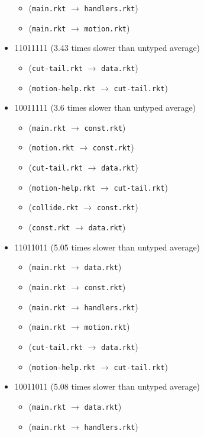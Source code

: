 \documentclass{article}
\newcommand{\mono}[1]{\texttt{#1}}
\begin{document}
\begin{itemize}
\begin{itemize}
  \item (\mono{main.rkt} $\rightarrow$ \mono{handlers.rkt})
  \item (\mono{main.rkt} $\rightarrow$ \mono{motion.rkt})
  \end{itemize}
\item 11011111 (3.43 times slower than untyped average)
  \begin{itemize}
  \item (\mono{cut-tail.rkt} $\rightarrow$ \mono{data.rkt})
  \item (\mono{motion-help.rkt} $\rightarrow$ \mono{cut-tail.rkt})
  \end{itemize}
\item 10011111 (3.6 times slower than untyped average)
  \begin{itemize}
  \item (\mono{main.rkt} $\rightarrow$ \mono{const.rkt})
  \item (\mono{motion.rkt} $\rightarrow$ \mono{const.rkt})
  \item (\mono{cut-tail.rkt} $\rightarrow$ \mono{data.rkt})
  \item (\mono{motion-help.rkt} $\rightarrow$ \mono{cut-tail.rkt})
  \item (\mono{collide.rkt} $\rightarrow$ \mono{const.rkt})
  \item (\mono{const.rkt} $\rightarrow$ \mono{data.rkt})
  \end{itemize}
\item 11011011 (5.05 times slower than untyped average)
  \begin{itemize}
  \item (\mono{main.rkt} $\rightarrow$ \mono{data.rkt})
  \item (\mono{main.rkt} $\rightarrow$ \mono{const.rkt})
  \item (\mono{main.rkt} $\rightarrow$ \mono{handlers.rkt})
  \item (\mono{main.rkt} $\rightarrow$ \mono{motion.rkt})
  \item (\mono{cut-tail.rkt} $\rightarrow$ \mono{data.rkt})
  \item (\mono{motion-help.rkt} $\rightarrow$ \mono{cut-tail.rkt})
  \end{itemize}
\item 10011011 (5.08 times slower than untyped average)
  \begin{itemize}
  \item (\mono{main.rkt} $\rightarrow$ \mono{data.rkt})
  \item (\mono{main.rkt} $\rightarrow$ \mono{handlers.rkt})

\end{itemize}
\end{itemize}
\end{document}
